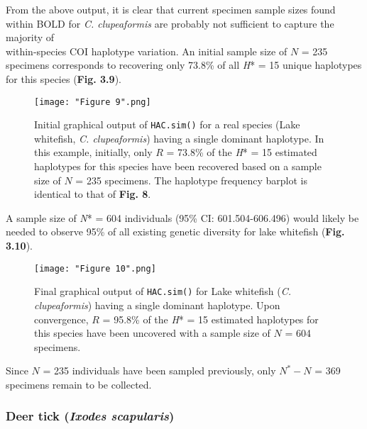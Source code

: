 \vspace{2mm}


From the above output, it is clear that current specimen sample sizes found within BOLD for \textit{C. clupeaformis} are probably not sufficient to capture the majority of \\ within-species COI haplotype variation. An initial sample size of $N$ = 235 specimens corresponds to recovering only 73.8\% of all \textit{H}* = 15 unique haplotypes for this species (\textbf{Fig. 3.9}). 


\begin{figure}[H]

\centering

\texttt{[image: "Figure 9".png]}

\caption{Initial graphical output of {\tt HAC.sim()} for a real species (Lake whitefish, \textit{C. clupeaformis}) having a single dominant haplotype. In this example, initially, only $R$ = 73.8\% of the \textit{H}* = 15 estimated haplotypes for this species have been recovered based on a sample size of $N$ = 235 specimens. The haplotype frequency barplot is identical to that of \textbf{Fig. 8}.}

\end{figure}


\noindent A sample size of \textit{N}* = 604 individuals (95\% CI: 601.504-606.496) would likely be needed to observe 95\% of all existing genetic diversity for lake whitefish (\textbf{Fig. 3.10}). 

\begin{figure}[H]

\centering

\texttt{[image: "Figure 10".png]}

\caption{Final graphical output of {\tt HAC.sim()} for Lake whitefish (\textit{C. clupeaformis}) having a single dominant haplotype. Upon convergence, $R$ = 95.8\% of the \textit{H}* = 15 estimated haplotypes for this species have been uncovered with a sample size of $N$ = 604 specimens.}

\end{figure}

\noindent Since $N$ = 235 individuals have been sampled previously, only $N^*-N$ = 369 specimens remain to be collected.


\subsubsection{Deer tick (\textit{Ixodes scapularis})}

